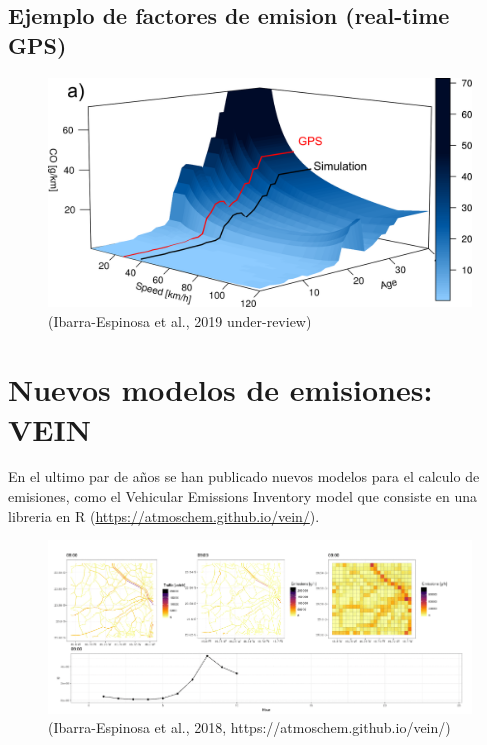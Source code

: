 \documentclass[]{book}
\begin{document}
\hypertarget{ejemplo-de-factores-de-emision-real-time-gps}{%
\subsection{Ejemplo de factores de emision (real-time GPS)}\label{ejemplo-de-factores-de-emision-real-time-gps}}

\begin{figure}
\includegraphics[width=30.61in]{figs/fig4_LDV_CO} \caption{(Ibarra-Espinosa et al., 2019 under-review)}\label{fig:unnamed-chunk-27}
\end{figure}

\hypertarget{nuevos-modelos-de-emisiones-vein}{%
\section{Nuevos modelos de emisiones: VEIN}\label{nuevos-modelos-de-emisiones-vein}}

En el ultimo par de años se han publicado nuevos modelos para el calculo de emisiones, como el Vehicular Emissions Inventory model \citep{gmd} que consiste en una libreria en R (\url{https://atmoschem.github.io/vein/}).

\begin{figure}
\includegraphics[width=1.3\linewidth]{figs/vein1} \caption{(Ibarra-Espinosa et al., 2018, https://atmoschem.github.io/vein/)}\label{fig:unnamed-chunk-28}
\end{figure}
\end{document}
